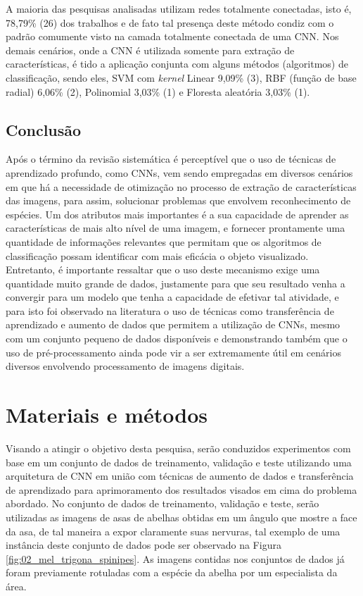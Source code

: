 \documentclass[
	12pt,				%
	oneside,			%
	a4paper,			%
	english,			%
	brazil				%
	]{abntex2ppgsi}
\begin{document}
A maioria das pesquisas analisadas utilizam redes totalmente conectadas, isto é, 78,79\% (26) dos trabalhos e de fato tal presença deste método condiz com o padrão comumente visto na camada totalmente conectada de uma CNN. Nos demais cenários, onde a CNN é utilizada somente para extração de características, é tido a aplicação conjunta com alguns métodos (algoritmos) de classificação, sendo eles, SVM com \textit{kernel} Linear 9,09\% (3), RBF (função de base radial) 6,06\% (2), Polinomial 3,03\% (1) e Floresta aleatória 3,03\% (1).

\section{Conclusão}
Após o término da revisão sistemática é perceptível que o uso de técnicas de aprendizado profundo, como CNNs, vem sendo empregadas em diversos cenários em que há a necessidade de otimização no processo de extração de características das imagens, para assim, solucionar problemas que envolvem reconhecimento de espécies. Um dos atributos mais importantes é a sua capacidade de aprender as características de mais alto nível de uma imagem, e fornecer prontamente uma quantidade de informações relevantes que permitam que os algoritmos de classificação possam identificar com mais eficácia o objeto visualizado. Entretanto, é importante ressaltar que o uso deste mecanismo exige uma quantidade muito grande de dados, justamente para que seu resultado venha a convergir para um modelo que tenha a capacidade de efetivar tal atividade, e para isto foi observado na literatura o uso de técnicas como transferência de aprendizado e aumento de dados que permitem a utilização de CNNs, mesmo com um conjunto pequeno de dados disponíveis e demonstrando também que o uso de pré-processamento ainda pode vir a ser extremamente útil em cenários diversos envolvendo processamento de imagens digitais.

\chapter{Materiais e métodos}
Visando a atingir o objetivo desta pesquisa, serão conduzidos experimentos com base em um conjunto de dados de treinamento, validação e teste utilizando uma arquitetura de CNN em união com técnicas de aumento de dados e transferência de aprendizado para aprimoramento dos resultados visados em cima do problema abordado. No conjunto de dados de treinamento, validação e teste, serão utilizadas as imagens de asas de abelhas obtidas em um ângulo que mostre a face da asa, de tal maneira a expor claramente suas nervuras, tal exemplo de uma instância deste conjunto de dados pode ser observado na Figura \ref{fig:02_mel_trigona_spinipes}. As imagens contidas nos conjuntos de dados já foram previamente rotuladas com a espécie da abelha por um especialista da área.
\end{document}
